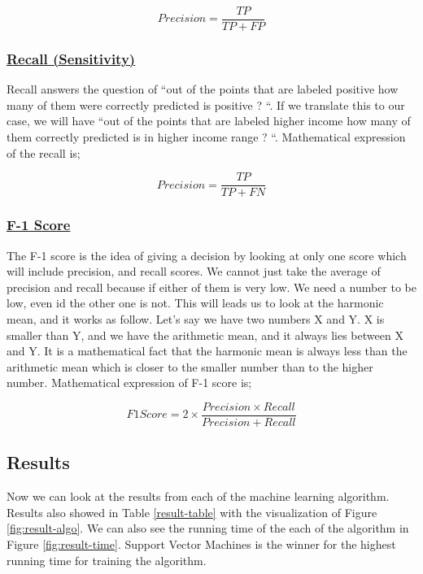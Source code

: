 \documentclass[sigconf]{acmart}
\begin{document}
\begin{equation}
Precision = \frac{TP} {TP + FP}
\end{equation}

\subsubsection{\textbf{\underline{Recall (Sensitivity)}}}

Recall answers the question of ``out of the points that are labeled positive how many of them were correctly predicted is positive ? ``. If we translate this to our case, we will have ``out of the points that are labeled higher income how many of them correctly predicted is in higher income range ? ``. Mathematical expression of the recall is; 

\begin{equation}
Precision = \frac{TP} {TP + FN}
\end{equation}

\subsubsection{\textbf{\underline{F-1 Score}}}

The F-1 score is the idea of giving a decision by looking at only one score which will include precision, and recall scores. We cannot just take the average of precision and recall because if either of them is very low. We need a number to be low, even id the other one is not. This will leads us to look at the harmonic mean, and it works as follow. Let's say we have two numbers X and Y. X is smaller than Y, and we have the arithmetic mean, and it always lies between X and Y. It is a mathematical fact that the harmonic mean is always less than the arithmetic mean which is closer to the smaller number than to the higher number. Mathematical expression of F-1 score is; 

\begin{equation}
F1 Score = 2 \times {\frac{Precision \times Recall} {Precision + Recall}}
\end{equation}

\subsection{Results}
Now we can look at the results from each of the machine learning algorithm. Results also showed in Table \ref{result-table} with the visualization of Figure \ref{fig:result-algo}. We can also see the running time of the each of the algorithm in Figure \ref{fig:result-time}. Support Vector Machines is the winner for the highest running time for training the algorithm. 
\end{document}
